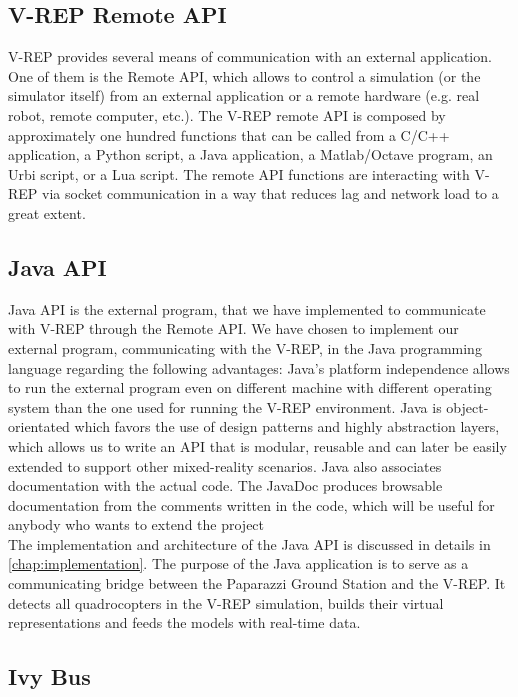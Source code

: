 \subsection{V-REP Remote API}
    V-REP provides several means of communication with an external application. One of them is the Remote API, which allows to control a simulation (or the simulator itself) from an external application or a remote hardware (e.g. real robot, remote computer, etc.). The V-REP remote API is composed by approximately one hundred functions that can be called from a C/C++ application, a Python script, a Java application, a Matlab/Octave program, an Urbi script, or a Lua script. The remote API functions are interacting with V-REP via socket communication in a way that reduces lag and network load to a great extent.
    
\subsection{Java API}
    Java API is the external program, that we have implemented to communicate with V-REP through the Remote API.
    We have chosen to implement our external program, communicating with the V-REP, in the Java programming language regarding the following advantages: Java's platform independence allows to run the external program even on different machine with different operating system than the one used for running the V-REP environment.  
    Java is object-orientated which favors the use of design patterns and highly abstraction layers, which allows us to write an API that is modular, reusable and can later be easily extended to support other mixed-reality scenarios. 
    Java also associates documentation with the actual code. 
    The JavaDoc produces browsable documentation from the comments written in the code, which will be useful for anybody who wants to extend the project\\
    
    The implementation and architecture of the Java API is discussed in details in \ref{chap:implementation}. 
    The purpose of the Java application is to serve as a communicating bridge between the Paparazzi Ground Station and the V-REP. 
    It detects all quadrocopters in the V-REP simulation, builds their virtual representations and feeds the models with real-time data.
    
\subsection{Ivy Bus}

